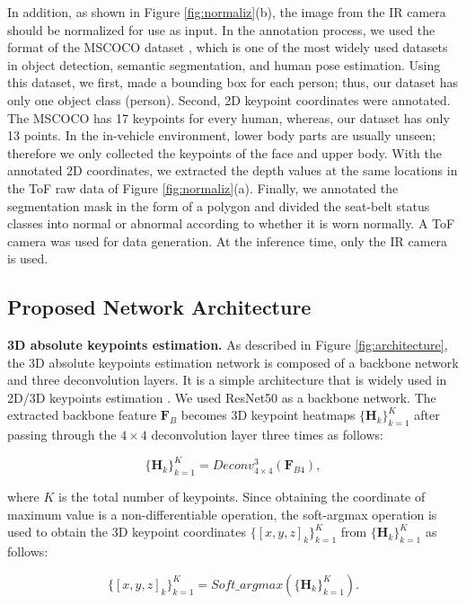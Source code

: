 \documentclass[letterpaper]{article} %
\begin{document}
In addition, as shown in Figure \ref{fig:normaliz}(b), the image from the IR camera should be normalized for use as input. In the annotation process, we used the format of the MSCOCO dataset \cite{lin2014microsoft}, which is one of the most widely used datasets in object detection, semantic segmentation, and human pose estimation. Using this dataset, we first, made a bounding box for each person; thus, our dataset has only one object class (person). Second, 2D keypoint coordinates were annotated. The MSCOCO has 17 keypoints for every human, whereas, our dataset has only 13 points.
In the in-vehicle environment, lower body parts are usually unseen; therefore we only collected the keypoints of the face and upper body. With the annotated 2D coordinates, we extracted the depth values at the same locations in the ToF raw data of Figure \ref{fig:normaliz}(a). Finally, we annotated the segmentation mask in the form of a polygon and divided the seat-belt status classes into normal or abnormal according to whether it is worn normally. A ToF camera was used for data generation. At the inference time, only the IR camera is used.

\subsection{Proposed Network Architecture}
\textbf{3D absolute keypoints estimation.} As described in Figure \ref{fig:architecture}, the 3D absolute keypoints estimation network is composed of a backbone network and three deconvolution layers. It is a simple architecture that is widely used in 2D/3D keypoints estimation \cite{xiao2018simple, moon2019camera}. We used ResNet50 \cite{he2016identity} as a backbone network. The extracted backbone feature $\textbf{F}_{B}$ becomes 3D keypoint heatmaps $\{{\mathbf H}_{k}\}_{k=1}^{K}$ after passing through the $4\times4$ deconvolution layer three times as follows:

\begin{equation} \label{1}
{\{{\mathbf H}_{k}\}_{k=1}^{K} = Deconv_{4\times4}^{3}(\textbf{F}_{B4})},
\end{equation}

\noindent where $K$ is the total number of keypoints. Since obtaining the coordinate of maximum value is a non-differentiable operation, the soft-argmax operation is used to obtain the 3D keypoint coordinates $\{[{x}, {y}, {z}]_{k}\}_{k=1}^{K}$ from $\{{\mathbf H}_{k}\}_{k=1}^{K}$ as follows:

\begin{equation} \label{2}
{\{[{x}, {y}, {z}]_{k}\}_{k=1}^{K} = Soft\_argmax(\{{\mathbf H}_{k}\}_{k=1}^{K})}.
\end{equation}
\end{document}
